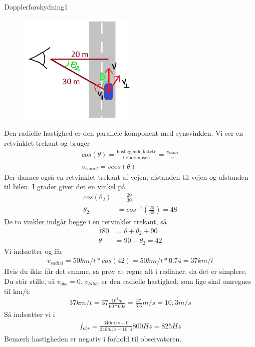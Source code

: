 \begin{opgave}{Dopplerforskydning}{1}
	\opg 
	\begin{figure}[h!]
		\centering
		\includegraphics[width=0.5\textwidth]{Astrofysik/Astrofig/PolitiLoesning.png}
	\end{figure}
	\opg Den radielle hastighed er den parallele komponent med synsvinklen. Vi ser en retvinklet trekant og bruger
	\begin{align}
		cos(\theta)=\frac{\text{hosliggende katete}}{\text{hypotenusen}}=\frac{v_{radiel}}{v} \\
		v_{radiel}=v cos(\theta)
	\end{align}
	Der dannes også en retvinklet trekant af vejen, afstanden til vejen og afstanden til bilen. I grader giver det en vinkel på
	\begin{align}
		cos(\theta_2)&=\frac{20}{30}\\
		\theta_2 &= cos^{-1} \left( \frac{20}{30} \right) = 48
	\end{align}
	De to vinkler indgår begge i en retvinklet trekant, så
	\begin{align}
		180 &= \theta + \theta_2 + 90\\
		\theta &= 90 - \theta_2  = 42
	\end{align}
	Vi indsætter og får
	\begin{align}
	v_{radiel}=50 km/t * cos(42) = 50 km/t * 0.74 = 37 km/t
	\end{align}
	Hvis du ikke får det samme, så prøv at regne alt i radianer, da det er simplere.
	\opg 
	Du står stille, så $v_{obs}=0$. $v_{kilde}$ er den radielle hastighed, som lige skal omregnes til km/t:
	\begin{align}
	37 km/t = 37 \frac{10^{3}m}{60*60 s} = \frac{37}{3.6} m/s = 10,3 m/s
	\end{align}
	Så indsætter vi i
	\begin{align}
	f_{obs} = \frac{340 m/s + 0}{340 m/s - 10,3} 800 Hz = 825 Hz
	\end{align}
	Bemærk hastigheden er negativ i forhold til observatøren.
\end{opgave}
